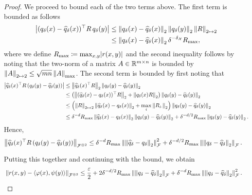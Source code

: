 \begin{proof}
    We proceed to bound each of the two terms above. The first term is bounded as follows
    \begin{align*}
        \abs{(q_\delta(x) - \hat{q}_\delta(x))^\top R\, q_\delta(y)} &\leq \twonorm{q_\delta(x) - \hat{q}_\delta(x)} \twonorm{q_\delta(y)} \norm{R}_{2 \mapsto 2}\\
        &\leq \twonorm{q_\delta(x) - \hat{q}_\delta(x)} \delta^{-\delta_\calX} R_{\max},
    \end{align*}
    where we define $R_{\max} \coloneq \max_{x,y} \lvert r(x,y)\rvert$ and the second inequality follows by noting that the two-norm of a matrix $A \in\mathbb{R}^{m \times n}$ is bounded by $\left\lVert A\right\rVert_{2 \mapsto 2} \leq \sqrt{m n} \left\lVert A\right\rVert_{\max}$. The second term is bounded by first noting that
    \begin{align*}
        \abs{\hat{q}_\delta(x)^\top R\, (q_\delta(y) - \hat{q}_\delta(y))} &\leq \twonorm{\hat{q}_\delta(x)^\top R} \twonorm{q_\delta(y) - \hat{q}_\delta(y)} \\
        &\leq \paren{\twonorm{(\hat{q}_\delta(x) - q_\delta(x))^\top R} + \twonorm{q_\delta(x) R}} \twonorm{q_\delta(y) - \hat{q}_\delta(y)}\\
        &\leq \paren{\norm{R}_{2 \mapsto 2} \twonorm{\hat{q}_\delta(x) - q_\delta(x)}+ \max_i \twonorm{R_{i\cdot}}} \twonorm{q_\delta(y) - \hat{q}_\delta(y)}\\
        &\leq \delta^{-d} R_{\max} \twonorm{\hat{q}_\delta(x) - q_\delta(x)} \twonorm{q_\delta(y) - \hat{q}_\delta(y)} + \delta^{-d / 2} R_{\max} \twonorm{q_\delta(y) - \hat{q}_\delta(y)}.
    \end{align*}
    Hence,
    \begin{align*}
        \norm{\hat{q}_\delta(x)^\top R\, (q_\delta(y) - \hat{q}_\delta(y))}_{\calF^{\otimes 2}} &\leq  \delta^{-d} R_{\max} \norm{\twonorm{\hat{q}_\delta - q_\delta}}_{\calF}^2 + \delta^{-d / 2} R_{\max} \norm{\twonorm{q_\delta - \hat{q}_\delta}}_{\calF}.
    \end{align*}

    Putting this together and continuing with the bound, we obtain
    \begin{align*}
        &\norm{r(x,y) - \iprod{\phi(x)}{\psi(y)}}_{\calF^{\otimes 2}} \leq \frac{\epsilon}{2} + 2 \delta^{- d / 2} R_{\max} \norm{\twonorm{q_\delta - \hat{q}_\delta}}_{\calF} + \delta^{- d} R_{\max} \norm{\twonorm{q_\delta - \hat{q}_\delta}}_{\calF}^2.
    \end{align*}


\end{proof}

